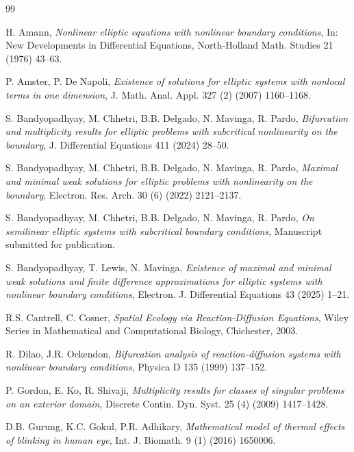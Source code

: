 \documentclass[12pt, reqno]{amsart}
\numberwithin{equation}{section}
\begin{document}

\begin{thebibliography}{99}

H. Amann,
\emph{Nonlinear elliptic equations with nonlinear boundary conditions},
In: New Developments in Differential Equations, North-Holland Math. Studies 21 (1976) 43--63.

P. Amster, P. De Napoli,
\emph{Existence of solutions for elliptic systems with nonlocal terms in one dimension},
J. Math. Anal. Appl. 327 (2) (2007) 1160--1168.

S. Bandyopadhyay, M. Chhetri, B.B. Delgado, N. Mavinga, R. Pardo,
\emph{Bifurcation and multiplicity results for elliptic problems with subcritical nonlinearity on the boundary},
J. Differential Equations 411 (2024) 28--50.

S. Bandyopadhyay, M. Chhetri, B.B. Delgado, N. Mavinga, R. Pardo,
\emph{Maximal and minimal weak solutions for elliptic problems with nonlinearity on the boundary},
Electron. Res. Arch. 30 (6) (2022) 2121--2137.

S. Bandyopadhyay, M. Chhetri, B.B. Delgado, N. Mavinga, R. Pardo,
\emph{On semilinear elliptic systems with subcritical boundary conditions},
Manuscript submitted for publication.

S. Bandyopadhyay, T. Lewis, N. Mavinga, 
\emph{Existence of maximal and minimal weak solutions and finite difference approximations for elliptic systems with nonlinear boundary conditions}, 
Electron. J. Differential Equations 43 (2025) 1--21. 

R.S. Cantrell, C. Cosner,
\emph{Spatial Ecology via Reaction-Diffusion Equations},
Wiley Series in Mathematical and Computational Biology, Chichester, 2003.

R. Dilao, J.R. Ockendon,
\emph{Bifurcation analysis of reaction-diffusion systems with nonlinear boundary conditions},
Physica D 135 (1999) 137--152.

P. Gordon, E. Ko, R. Shivaji,
\emph{Multiplicity results for classes of singular problems on an exterior domain},
Discrete Contin. Dyn. Syst. 25 (4) (2009) 1417--1428.

D.B. Gurung, K.C. Gokul, P.R. Adhikary,
\emph{Mathematical model of thermal effects of blinking in human eye},
Int. J. Biomath. 9 (1) (2016) 1650006.


\end{thebibliography}
\end{document}
